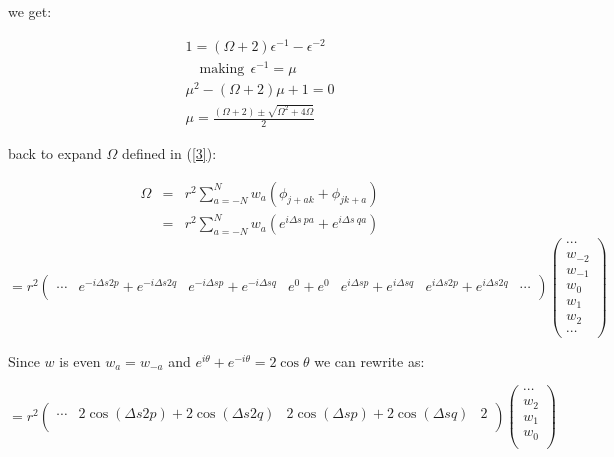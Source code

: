 \documentclass[legalpaper, 12pt]{article}
\begin{document}
we get:

\begin{eqnarray}
1  =  \left( \Omega + 2 \right) \epsilon^{-1} -\epsilon^{-2} \nonumber \\
\quad \text{making} \ \ \epsilon^{-1} = \mu \nonumber \\
\mu^2 - \left( \Omega + 2 \right) \mu + 1 = 0 \nonumber \\
\mu = \frac{(\Omega+2) \pm \sqrt{\Omega^2 + 4\Omega}}{2} \label{4}
\end{eqnarray}

back to expand $ \Omega $ defined in (\ref{3}):

\begin{eqnarray}
\Omega &=& r^2 \sum_{a=-N}^N  w_a \left( \phi_{j+a k} + \phi_{j k+a}  \right) \nonumber \\
	&=& r^2 \sum_{a=-N}^{N} w_a ( e^{i \Delta s \ p a} + e^{i \Delta s \ q a} )\nonumber 
\end{eqnarray}
\begin{equation}
=r^2
\begin{pmatrix}
 \cdots & e^{-i \Delta s 2 p} + e^{-i \Delta s 2 q} & e^{-i \Delta s p} + e^{-i \Delta s q} & e^0+e^0 & e^{i \Delta s p} + e^{i \Delta s q} & e^{i \Delta s 2 p} + e^{i \Delta s 2 q} & \cdots \\
\end{pmatrix}
\begin{pmatrix}
\cdots \\
w_{-2} \\
w_{-1} \\
w_0 \\
w_1 \\
w_2 \\
\cdots
\end{pmatrix}
\nonumber
\end{equation}

Since $w$ is even $ w_a = w_{-a} $ and $ e^{i\theta} + e^{-i\theta} = 2 \cos{\theta} $ we can rewrite as:

\begin{equation}
=r^2
\begin{pmatrix}
 \cdots & 2\cos( \Delta s 2 p) + 2\cos(\Delta s 2 q) & 2\cos(\Delta s p) + 2\cos(\Delta s q) & 2 \\
\end{pmatrix}
\begin{pmatrix}
\cdots \\
w_{2} \\
w_{1} \\
w_0 \\
\end{pmatrix}
\nonumber
\end{equation}
\end{document}

